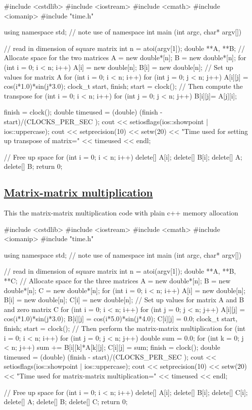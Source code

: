 \documentclass[%
oneside,                 %
final,                   %
10pt]{article}
\begin{document}
\bcppcode
#include <cstdlib>
#include <iostream>
#include <cmath>
#include <iomanip>
#include "time.h"

using namespace std; // note use of namespace
int main (int argc, char* argv[])
{
  // read in dimension of square matrix
  int n = atoi(argv[1]);
  double **A, **B;
  // Allocate space for the two matrices
  A = new double*[n]; B = new double*[n];
  for (int i = 0; i < n; i++){
    A[i] = new double[n];
    B[i] = new double[n];
  }
  // Set up values for matrix A
  for (int i = 0; i < n; i++){
    for (int j = 0; j < n; j++) {
      A[i][j] =  cos(i*1.0)*sin(j*3.0);
    }
  }
  clock_t start, finish;
  start = clock();
  // Then compute the transpose
  for (int i = 0; i < n; i++){
    for (int j = 0; j < n; j++) {
      B[i][j]= A[j][i];
    }
  }

  finish = clock();
  double timeused = (double) (finish - start)/(CLOCKS_PER_SEC );
  cout << setiosflags(ios::showpoint | ios::uppercase);
  cout << setprecision(10) << setw(20) << "Time used  for setting up transpose of matrix=" << timeused  << endl;

  // Free up space
  for (int i = 0; i < n; i++){
    delete[] A[i];
    delete[] B[i];
  }
  delete[] A;
  delete[] B;
  return 0;
}

\ecppcode


\subsection{\href{{https://github.com/CompPhysics/ComputationalPhysicsMSU/blob/master/doc/Programs/LecturePrograms/programs/Classes/cpp/program9.cpp}}{Matrix-matrix multiplication}}
This the matrix-matrix multiplication code with plain c++ memory allocation

\bccq
#include <cstdlib>
#include <iostream>
#include <cmath>
#include <iomanip>
#include "time.h"

using namespace std; // note use of namespace
int main (int argc, char* argv[])
{
  // read in dimension of square matrix
  int n = atoi(argv[1]);
  double **A, **B, **C;
  // Allocate space for the three matrices
  A = new double*[n]; B = new double*[n]; C = new double*[n];
  for (int i = 0; i < n; i++){
    A[i] = new double[n];
    B[i] = new double[n];
    C[i] = new double[n];
  }
  // Set up values for matrix A and B and zero matrix C
  for (int i = 0; i < n; i++){
    for (int j = 0; j < n; j++) {
      A[i][j] =  cos(i*1.0)*sin(j*3.0);
      B[i][j] =  cos(i*5.0)*sin(j*4.0);
      C[i][j] =  0.0;    
    }
  }
  clock_t start, finish;
  start = clock();
  // Then perform the matrix-matrix multiplication
  for (int i = 0; i < n; i++){
    for (int j = 0; j < n; j++) {
       double sum = 0.0;
       for (int k = 0; j < n; j++) {
            sum += B[i][k]*A[k][j];
       }
       C[i][j] = sum;
    }
  }
  finish = clock();
  double timeused = (double) (finish - start)/(CLOCKS_PER_SEC );
  cout << setiosflags(ios::showpoint | ios::uppercase);
  cout << setprecision(10) << setw(20) << "Time used  for matrix-matrix multiplication=" << timeused  << endl;

  // Free up space
  for (int i = 0; i < n; i++){
    delete[] A[i];
    delete[] B[i];
    delete[] C[i];
  }
  delete[] A;
  delete[] B;
  delete[] C;
  return 0;
}
\end{document}
